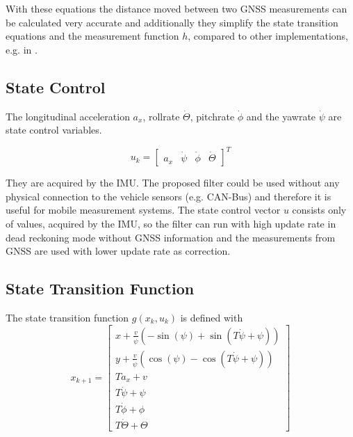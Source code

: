 \documentclass[conference]{IEEEtran}
\begin{document}
With these equations the distance moved between two GNSS measurements can be calculated very accurate and additionally they simplify the state transition equations and the measurement function $h$, compared to other implementations, e.g. in \cite{Wender2008a}.

\subsection{State Control}

The longitudinal acceleration $a_x$, rollrate $\dot \Theta$, pitchrate $\dot \phi$ and the yawrate $\dot \psi$ are state control variables.

\begin{equation}\label{controlinput}u_k=\left[\begin{matrix}a_x & \dot\psi & \dot\phi & \dot\Theta \end{matrix}\right]^T\end{equation}

They are acquired by the IMU. The proposed filter could be used without any physical connection to the vehicle sensors (e.g. CAN-Bus) and therefore it is useful for mobile measurement systems. The state control vector $u$ consists only of values, acquired by the IMU, so the filter can run with high update rate in dead reckoning mode without GNSS information and the measurements from GNSS are used with lower update rate as correction.

\subsection{State Transition Function}

The state transition function $g(x_k, u_k)$ is defined with
\begin{equation}\label{statetransitionfunction}
x_{k+1}=\left[\begin{matrix}x + \frac{v}{\dot\psi} \left(- \sin{\left (\psi \right )} + \sin{\left (T \dot\psi + \psi \right )}\right)\\y + \frac{v}{\dot\psi} \left(\cos{\left (\psi \right )} - \cos{\left (T \dot\psi + \psi \right )}\right)\\T a_{x} + v\\T \dot\psi + \psi\\T \dot\phi + \phi\\T \dot\Theta + \Theta\end{matrix}\right]
\end{equation}
\end{document}
